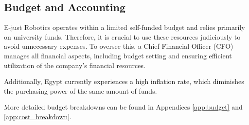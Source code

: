 \subsection{Budget and Accounting}

E-just Robotics operates within a limited self-funded budget and relies primarily on university funds. Therefore, it is crucial to use these resources judiciously to avoid unnecessary expenses. To oversee this, a Chief Financial Officer (CFO) manages all financial aspects, including budget setting and ensuring efficient utilization of the company's financial resources.

\hspace{10pt} Additionally, Egypt currently experiences a high inflation rate, which diminishes the purchasing power of the same amount of funds. 

\hspace{10pt} More detailed budget breakdowns can be found in Appendices \ref{app:budget} and \ref{app:cost_breakdown}.
